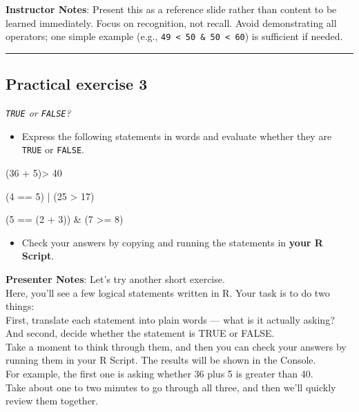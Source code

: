 \documentclass[
  letterpaper,
  DIV=11,
  numbers=noendperiod]{scrartcl}
\newenvironment{Shaded}{\begin{snugshade}}{\end{snugshade}}
\newcommand{\DecValTok}[1]{\textcolor[rgb]{0.68,0.00,0.00}{#1}}
\newcommand{\NormalTok}[1]{\textcolor[rgb]{0.00,0.23,0.31}{#1}}
\newcommand{\SpecialCharTok}[1]{\textcolor[rgb]{0.37,0.37,0.37}{#1}}
\providecommand{\tightlist}{%
  \setlength{\itemsep}{0pt}\setlength{\parskip}{0pt}}
\begin{document}
\textbf{Instructor Notes}: Present this as a reference slide rather than
content to be learned immediately. Focus on recognition, not recall.
Avoid demonstrating all operators; one simple example (e.g.,
\texttt{49\ \textless{}\ 50\ \&\ 50\ \textless{}\ 60}) is sufficient if
needed.

\begin{center}\rule{0.5\linewidth}{0.5pt}\end{center}

\subsection{Practical exercise 3}\label{practical-exercise-3}

\emph{\texttt{TRUE} or \texttt{FALSE}?}

\begin{itemize}
\tightlist
\item[$\square$]
  Express the following statements in words and evaluate whether they
  are \texttt{TRUE} or \texttt{FALSE}.
\end{itemize}

\begin{Shaded}
\begin{Highlighting}[]
\NormalTok{(}\DecValTok{36} \SpecialCharTok{+} \DecValTok{5}\NormalTok{)}\SpecialCharTok{\textgreater{}} \DecValTok{40}

\NormalTok{(}\DecValTok{4} \SpecialCharTok{==} \DecValTok{5}\NormalTok{) }\SpecialCharTok{|}\NormalTok{ (}\DecValTok{25} \SpecialCharTok{\textgreater{}} \DecValTok{17}\NormalTok{)}

\NormalTok{(}\DecValTok{5} \SpecialCharTok{==}\NormalTok{ (}\DecValTok{2} \SpecialCharTok{+} \DecValTok{3}\NormalTok{)) }\SpecialCharTok{\&}\NormalTok{ (}\DecValTok{7} \SpecialCharTok{\textgreater{}=} \DecValTok{8}\NormalTok{)}
\end{Highlighting}
\end{Shaded}

\begin{itemize}
\tightlist
\item[$\square$]
  Check your answers by copying and running the statements in
  \textbf{your R Script}.
\end{itemize}

\textbf{Presenter Notes}: Let's try another short exercise.\\
Here, you'll see a few logical statements written in R. Your task is to
do two things:\\
First, translate each statement into plain words --- what is it actually
asking?\\
And second, decide whether the statement is TRUE or FALSE.\\
Take a moment to think through them, and then you can check your answers
by running them in your R Script. The results will be shown in the
Console.\\
For example, the first one is asking whether 36 plus 5 is greater than
40.\\
Take about one to two minutes to go through all three, and then we'll
quickly review them together.
\end{document}

